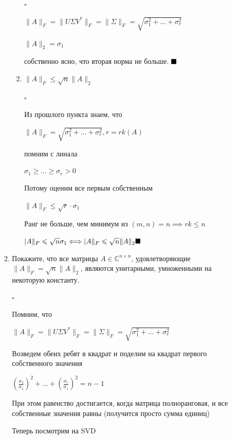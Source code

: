 \documentclass[a4paper, 11pt]{article}
\begin{document}
\begin{enumerate}
\begin{enumerate}
\begin{enumerate}
					$\square$
						
						$\| A \|_F = \| U \Sigma V^* \|_F = \| \Sigma \|_F = \sqrt{\sigma_1^2 + \dots + \sigma_r^2}$
						
						$\| A \|_2 = \sigma_1$
						
						собственно ясно, что вторая норма не больше. $\hfill \blacksquare$
						
					\item $\|A\|_F \leq \sqrt{n} \|A\|_2$
					
						$\square$
						
							Из прошлого пункта знаем, что 
						
							$\| A \|_F = \sqrt{\sigma_1^2 + \dots + \sigma_r^2}, r = rk(A)$
							
								помним с линала
								
								$\sigma_1 \geqslant \dots \geqslant \sigma_r > 0$
								
								Потому оценим все первым собственным
								
								$\| A \|_F \leqslant \sqrt{r} \cdot \sigma_1$
								
								Ранг не больше, чем минимум из $(m, n) = n \implies rk \leqslant n$
								
								$| A \|_F \leqslant \sqrt{n} \sigma_1 \Longleftrightarrow | A \|_F \leqslant \sqrt{n} \| A \|_2 \hfill \blacksquare$
							
						
				\end{enumerate}
			
			
			\item Покажите, что все матрицы $A\in\mathbb{C}^{n\times n}$, удовлетворяющие $\|A\|_F = \sqrt{n} \|A\|_2$, являются унитарными, умноженными на некоторую константу.
			
			$\square$
			
				Помним, что 
				
				$\| A \|_F = \| U \Sigma V^* \|_F = \| \Sigma \|_F = \sqrt{\sigma_1^2 + \dots + \sigma_r^2}$
				
				Возведем обеих ребят в квадрат и поделим на квадрат первого собственного значения
				
				$(\frac{\sigma_2}{\sigma_1})^2 + \dots + (\frac{\sigma_r}{\sigma_1})^2 = n - 1$
				
				
				При этом равенство достигается, когда матрица полноранговая, и все собственные значения равны (получится просто сумма единиц)
				
				Теперь посмотрим на SVD
				

\end{enumerate}
\end{enumerate}
\end{document}

